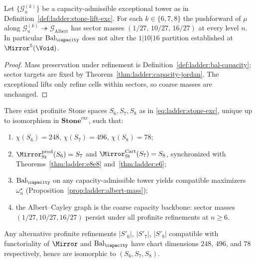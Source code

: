 \begin{proposition}
\label{prop:ladder:albert-mass}
Let $\{\mathcal{G}_n^{(k)}\}$ be a capacity-admissible exceptional tower as in
Definition~\ref{def:ladder:stone-lift-exc}. For each $k\in\{6,7,8\}$ the
pushforward of $\mu$ along
$\mathcal{G}_n^{(k)}\twoheadrightarrow\mathcal{G}_{\mathrm{Albert}}$ has sector
masses $(1/27,\,10/27,\,16/27)$ at every level $n$. In particular
$\mathrm{Bal}_\capacity$ does not alter the $1|10|16$ partition established at
$\Mirror^5(\Void)$.
\end{proposition}

\begin{proof}
Mass preservation under refinement is Definition~\ref{def:ladder:bal-capacity};
sector targets are fixed by Theorem~\ref{thm:ladder:capacity-jordan}. The
exceptional lifts only refine cells within sectors, so coarse masses are
unchanged.
\end{proof}

\begin{theorem}
\label{thm:ladder:stone-e8}
There exist profinite Stone spaces $S_6,S_7,S_8$ as in
\eqref{eq:ladder:stone-exc}, unique up to isomorphism in
$\mathbf{Stone}^{\mathrm{exc}}$, such that:
\begin{enumerate}[label=(\roman*),leftmargin=*]
  \item $\chi(S_6)=248$, $\chi(S_7)=496$, $\chi(S_8)=78$;
  \item $\Mirror_{\mathrm{St}}^{\mathrm{prod}}(S_6)=S_7$ and
    $\Mirror_{\mathrm{St}}^{\mathrm{Cart}}(S_7)=S_8$, synchronized with
    Theorems~\ref{thm:ladder:e8e8} and~\ref{thm:ladder:e6};
  \item $\mathrm{Bal}_\capacity$ on any capacity-admissible tower yields
    compatible maximizers $\omega^\star_n$ (Proposition~\ref{prop:ladder:albert-mass});
  \item the Albert--Cayley graph is the coarse capacity backbone: sector masses
    $(1/27,10/27,16/27)$ persist under all profinite refinements at $n\geq6$.
\end{enumerate}
Any alternative profinite refinements $|S'_6|$, $|S'_7|$, $|S'_8|$ compatible
with functoriality of $\Mirror$ and $\mathrm{Bal}_\capacity$ have chart
dimensions $248$, $496$, and $78$ respectively, hence are isomorphic to
$(S_6,S_7,S_8)$.
\end{theorem}

